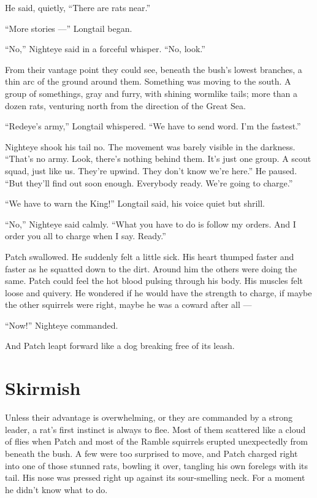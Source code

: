 \documentclass[12pt]{memoir}
\begin{document}
He said, quietly, “There are rats near.”

“More stories —” Longtail began.

“No,” Nighteye said in a forceful whisper. “No, look.”

From their vantage point they could see, beneath the bush’s lowest
branches, a thin arc of the ground around them. Something was moving
to the south. A group of somethings, gray and furry, with shining
wormlike tails; more than a dozen rats, venturing north from the
direction of the Great Sea.

“Redeye’s army,” Longtail whispered. “We have to send word. I’m the
fastest.”

Nighteye shook his tail no. The movement was barely visible in the
darkness. “That’s no army. Look, there’s nothing behind them. It’s
just one group. A scout squad, just like us. They’re upwind. They
don’t know we’re here.” He paused. “But they’ll find out soon
enough. Everybody ready. We’re going to charge.”

“We have to warn the King!” Longtail said, his voice quiet but shrill.

“No,” Nighteye said calmly. “What you have to do is follow my
orders. And I order you all to charge when I say. Ready.”

Patch swallowed. He suddenly felt a little sick. His heart thumped
faster and faster as he squatted down to the dirt. Around him the
others were doing the same. Patch could feel the hot blood pulsing
through his body. His muscles felt loose and quivery. He wondered if
he would have the strength to charge, if maybe the other squirrels
were right, maybe he was a coward after all —

“Now!” Nighteye commanded.

And Patch leapt forward like a dog breaking free of its leash.


\section{Skirmish}

Unless their advantage is overwhelming, or they are commanded by a
strong leader, a rat’s first instinct is always to flee. Most of them
scattered like a cloud of flies when Patch and most of the Ramble
squirrels erupted unexpectedly from beneath the bush. A few were too
surprised to move, and Patch charged right into one of those stunned
rats, bowling it over, tangling his own forelegs with its tail. His
nose was pressed right up against its sour-smelling neck. For a moment
he didn’t know what to do.
\end{document}
